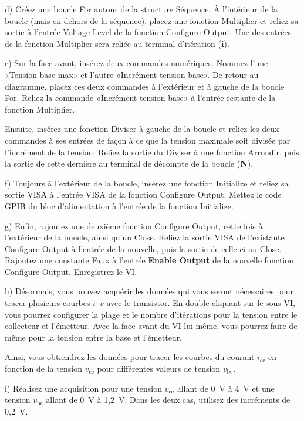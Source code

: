 \documentclass[canadien,12pt,oneside,letterpaper]{article}
\begin{document}
d) Créez une boucle For autour de la structure Séquence. À l'intérieur de la boucle (mais en-dehors de la séquence), placez une fonction Multiplier et reliez sa sortie à l'entrée Voltage Level de la fonction Configure Output. Une des entrées de la fonction Multiplier sera reliée au terminal d'itération (\textbf{i}).

e) Sur la face-avant, insérez deux commandes numériques. Nommez l'une «Tension base max» et l'autre «Incrément tension base». De retour au diagramme, placez ces deux commandes à l'extérieur et à gauche de la boucle For. Reliez la commande «Incrément tension base» à l'entrée restante de la fonction Multiplier.

Ensuite, insérez une fonction Diviser à gauche de la boucle et reliez les deux commandes à ses entrées de façon à ce que la tension maximale soit divisée par l'incrément de la tension. Reliez la sortie du Diviser à une fonction Arrondir, puis la sortie de cette dernière au terminal de décompte de la boucle (\textbf{N}).

f) Toujours à l'extérieur de la boucle, insérez une fonction Initialize et reliez sa sortie VISA à l'entrée VISA de la fonction Configure Output. Mettez le code GPIB du bloc d'alimentation à l'entrée de la fonction Initialize.

g) Enfin, rajoutez une deuxième fonction Configure Output, cette fois à l'extérieur de la boucle, ainsi qu'un Close. Reliez la sortie VISA de l'existante Configure Output à l'entrée de la nouvelle, puis la sortie de celle-ci au Close. Rajoutez une constante Faux à l'entrée \textbf{Enable Output} de la nouvelle fonction Configure Output. Enregistrez le VI.

h) Désormais, vous pouvez acquérir les données qui vous seront nécessaires pour tracer plusieurs courbes $i$--$v$ avec le transistor. En double-cliquant sur le sous-VI, vous pourrez configurer la plage et le nombre d'itérations pour la tension entre le collecteur et l'émetteur. Avec la face-avant du VI lui-même, vous pourrez faire de même pour la tension entre la base et l'émetteur.

Ainsi, vous obtiendrez les données pour tracer les courbes du courant $i_{\mathrm{ce}}$ en fonction de la tension $v_{\mathrm{ce}}$ pour différentes valeurs de tension $v_{\mathrm{be}}$.

i) Réalisez une acquisition pour une tension $v_{\mathrm{ce}}$ allant de 0~V à 4~V et une tension $v_{\mathrm{be}}$ allant de 0~V à 1,2~V. Dans les deux cas, utilisez des incréments de 0,2~V.
\end{document}
